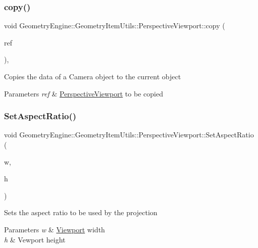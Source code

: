 \subsubsection{\texorpdfstring{copy()}{copy()}}
{\footnotesize\ttfamily void Geometry\+Engine\+::\+Geometry\+Item\+Utils\+::\+Perspective\+Viewport\+::copy (\begin{DoxyParamCaption}\item[{const \mbox{\hyperlink{class_geometry_engine_1_1_geometry_item_utils_1_1_perspective_viewport}{Perspective\+Viewport}} \&}]{ref }\end{DoxyParamCaption})\hspace{0.3cm}{\ttfamily [protected]}, {\ttfamily [virtual]}}

Copies the data of a Camera object to the current object 
\begin{DoxyParams}{Parameters}
{\em ref} & \mbox{\hyperlink{class_geometry_engine_1_1_geometry_item_utils_1_1_perspective_viewport}{Perspective\+Viewport}} to be copied \\
\hline
\end{DoxyParams}
\mbox{\label{class_geometry_engine_1_1_geometry_item_utils_1_1_perspective_viewport_a916b7090b29f070efe8ca4b91e818182}} 
\subsubsection{\texorpdfstring{SetAspectRatio()}{SetAspectRatio()}}
{\footnotesize\ttfamily void Geometry\+Engine\+::\+Geometry\+Item\+Utils\+::\+Perspective\+Viewport\+::\+Set\+Aspect\+Ratio (\begin{DoxyParamCaption}\item[{int}]{w,  }\item[{int}]{h }\end{DoxyParamCaption})\hspace{0.3cm}{\ttfamily [inline]}}

Sets the aspect ratio to be used by the projection 
\begin{DoxyParams}{Parameters}
{\em w} & \mbox{\hyperlink{class_geometry_engine_1_1_geometry_item_utils_1_1_viewport}{Viewport}} width \\
\hline
{\em h} & Vewport height \\
\hline
\end{DoxyParams}
\mbox{\label{class_geometry_engine_1_1_geometry_item_utils_1_1_perspective_viewport_ad53e3996cca001300427d04eb340bdee}} 
